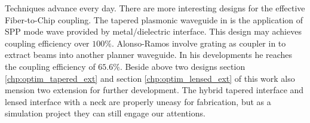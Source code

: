 Techniques advance every day. There are more interesting designs for the effective Fiber-to-Chip coupling. The tapered plasmonic waveguide in \cite{tapered_plasmonic_waveguides} is the application of SPP mode wave provided by metal/dielectric interface. This design may achieves coupling efficiency over $100\%$. Alonso-Ramos involve grating as coupler in \cite{fiber_to_chip_grating_waveguides}  to extract beams into another planner waveguide. In his developments he reaches the coupling efficiency of $65.6\%$. Beside above two designs section \ref{chp:optim_tapered_ext} and section \ref{chp:optim_lensed_ext} of this work also mension two extension for further development. The hybrid tapered interface and lensed interface with a neck are properly uneasy for fabrication, but as a simulation project they can still engage our attentions.
